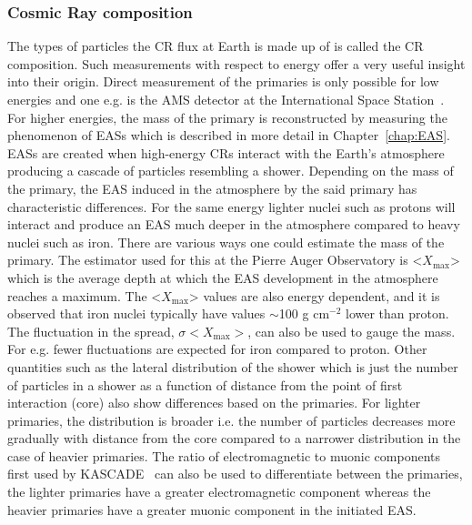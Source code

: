 \subsubsection*{Cosmic Ray composition}
\label{subsubsec:CRcompo}
The types of particles the \gls{CR} flux at Earth is made up of is called the \gls*{CR} composition. Such measurements with respect to energy offer a very useful insight into their origin. Direct measurement of the primaries is only possible for low energies and one e.g. is the AMS detector at the International Space Station~\cite{PhysRevLett.110.141102}. For higher energies, the mass of the primary is reconstructed by measuring the phenomenon of \glspl{EAS} which is described in more detail in Chapter~\ref{chap:EAS}. \glspl*{EAS} are created when high-energy \glspl{CR} interact with the Earth's atmosphere producing a cascade of particles resembling a shower.  Depending on the mass of the primary, the \gls{EAS} induced in the atmosphere by the said primary has characteristic differences. For the same energy lighter nuclei such as protons will interact and produce an \gls{EAS} much deeper in the atmosphere compared to heavy nuclei such as iron. There are various ways one could estimate the mass of the primary. The estimator used for this at the Pierre Auger Observatory is <$X_{\text{max}}$> which is the average depth at which the \gls{EAS} development in the atmosphere reaches a maximum. The <$X_{\text{max}}$> values are also energy dependent, and it is observed that iron nuclei typically have values $\sim$100 g cm$^{-2}$ lower than proton. The fluctuation in the spread, $\sigma<X_{\text{max}}>$, can also be used to gauge the mass. For e.g. fewer fluctuations are expected for iron compared to proton. Other quantities such as the lateral distribution of the shower which is just the number of particles in a shower as a function of distance from the point of first interaction (core) also show differences based on the primaries. For lighter primaries, the distribution is broader i.e. the number of particles decreases more gradually with distance from the core compared to a narrower distribution in the case of heavier primaries. The ratio of electromagnetic to muonic components first used by KASCADE~\cite{SCHATZ1998151} can also be used to differentiate between the primaries, the lighter primaries have a greater electromagnetic component whereas the heavier primaries have a greater muonic component in the initiated EAS.    

